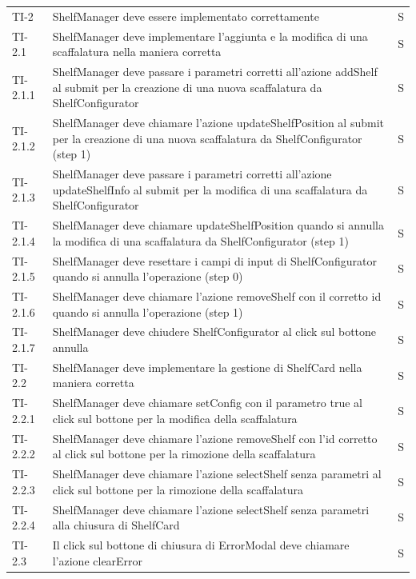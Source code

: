 \begin{xltabular}{0.9\textwidth}{X | p{0.6\textwidth}  | p{0.1\textwidth}}
    TI-2 & ShelfManager deve essere implementato correttamente & S\\
    TI-2.1 & ShelfManager deve implementare l'aggiunta e la modifica di una scaffalatura nella maniera corretta & S\\
    TI-2.1.1 & ShelfManager deve passare i parametri corretti all'azione addShelf al submit per la creazione di una nuova scaffalatura da ShelfConfigurator & S\\
    TI-2.1.2 & ShelfManager deve chiamare l'azione updateShelfPosition al submit per la creazione di una nuova scaffalatura da ShelfConfigurator (step 1) & S\\
    TI-2.1.3 & ShelfManager deve passare i parametri corretti all'azione updateShelfInfo al submit per la modifica di una scaffalatura da ShelfConfigurator & S\\
    TI-2.1.4 & ShelfManager deve chiamare updateShelfPosition quando si annulla la modifica di una scaffalatura da ShelfConfigurator  (step 1) & S\\
    TI-2.1.5 & ShelfManager deve resettare i campi di input di ShelfConfigurator quando si annulla l'operazione (step 0) & S\\
    TI-2.1.6 & ShelfManager deve chiamare l'azione removeShelf con il corretto id quando si annulla l'operazione (step 1) & S\\
    TI-2.1.7 & ShelfManager deve chiudere ShelfConfigurator al click sul bottone annulla & S\\
    TI-2.2 & ShelfManager deve implementare la gestione di ShelfCard nella maniera corretta & S\\
    TI-2.2.1 & ShelfManager deve chiamare setConfig con il parametro true al click sul bottone per la modifica della scaffalatura & S\\  
    TI-2.2.2 & ShelfManager deve chiamare l'azione removeShelf con l'id corretto al click sul bottone per la rimozione della scaffalatura & S\\
    TI-2.2.3 & ShelfManager deve chiamare l'azione selectShelf senza parametri al click sul bottone per la rimozione della scaffalatura & S\\
    TI-2.2.4 & ShelfManager deve chiamare l'azione selectShelf senza parametri alla chiusura di ShelfCard & S\\
    TI-2.3 & Il click sul bottone di chiusura di ErrorModal deve chiamare l'azione clearError & S\\


\end{xltabular}
